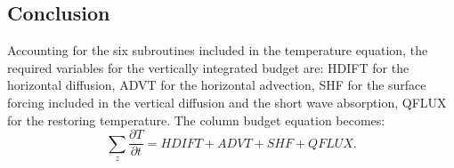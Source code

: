 \begin{appendices}
\subsection{Conclusion}

Accounting for the six subroutines included in the temperature equation, the required variables for the vertically integrated budget are: HDIFT for the horizontal diffusion, ADVT for the horizontal advection, SHF for the surface forcing included in the vertical diffusion and the short wave absorption, QFLUX for the restoring temperature. The column budget equation becomes:
\begin{equation}
\sum_z \frac{\partial T}{\partial t} = HDIFT+ADVT+SHF+QFLUX.
\end{equation}

\end{appendices}





